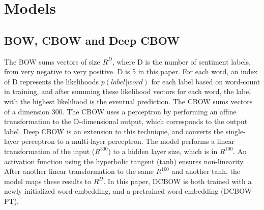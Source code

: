 \vspace{-5pt}
\section{Models}
\label{sec: models}
\vspace{-5pt}
\subsection{BOW, CBOW and Deep CBOW}
The BOW sums vectors of size $R^{D}$, where D is the number of sentiment labels,
from very negative to very positive. D is 5 in this paper. For each word, an
index of D represents the likelihoods $p(label|word)$ for each label based on
word-count in training, and after summing these likelihood vectors for each
word, the label with the highest likelihood is the eventual prediction. The CBOW
sums vectors of a dimension 300. The CBOW uses a perceptron by performing an
affine transformation to the D-dimensional output, which corresponds to the
output label. Deep CBOW is an extension to this technique, and converts the
single-layer perceptron to a multi-layer perceptron. The model performs a linear
transformation of the input ($R^{300}$) to a hidden layer size, which is in
$R^{100}$. An activation function using the hyperbolic tangent (tanh) ensures
non-linearity. After another linear transformation to the same $R^{100}$ and
another tanh, the model maps these results to $R^D$. In this paper, DCBOW is
both trained with a newly initialized word-embedding, and a pretrained word
embedding (DCBOW-PT).
\vspace{-5pt}
